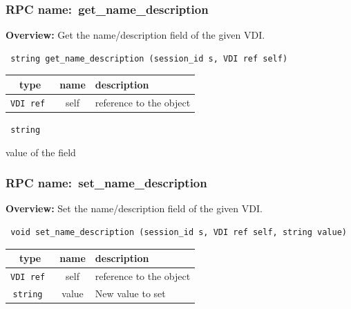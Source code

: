 \vspace{0.3cm}
\vspace{0.3cm}
\vspace{0.3cm}
\subsubsection{RPC name:~get\_name\_description}

{\bf Overview:} 
Get the name/description field of the given VDI.

\begin{verbatim} string get_name_description (session_id s, VDI ref self)\end{verbatim}



 
\vspace{0.3cm}
\begin{tabular}{|c|c|p{7cm}|}
 \hline
{\bf type} & {\bf name} & {\bf description} \\ \hline
{\tt VDI ref } & self & reference to the object \\ \hline 

\end{tabular}

\vspace{0.3cm}

{\tt 
string
}


value of the field
\vspace{0.3cm}
\vspace{0.3cm}
\vspace{0.3cm}
\subsubsection{RPC name:~set\_name\_description}

{\bf Overview:} 
Set the name/description field of the given VDI.

\begin{verbatim} void set_name_description (session_id s, VDI ref self, string value)\end{verbatim}



 
\vspace{0.3cm}
\begin{tabular}{|c|c|p{7cm}|}
 \hline
{\bf type} & {\bf name} & {\bf description} \\ \hline
{\tt VDI ref } & self & reference to the object \\ \hline 

{\tt string } & value & New value to set \\ \hline 

\end{tabular}

